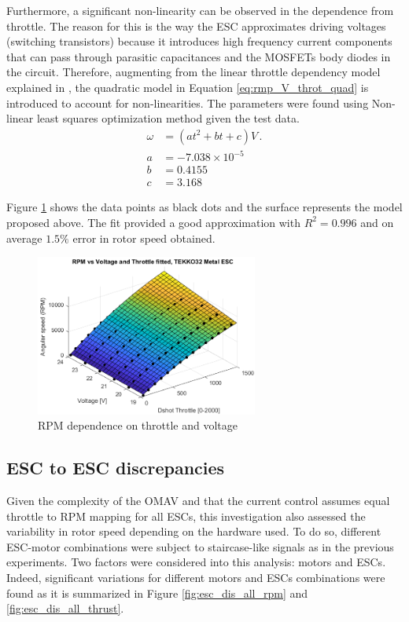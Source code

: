 Furthermore, a significant non-linearity can be observed in the dependence from throttle. The reason for this is the way the ESC approximates driving voltages (switching transistors) because it introduces high frequency current components that can pass through parasitic capacitances and the MOSFETs body diodes in the circuit. Therefore, augmenting from the linear throttle dependency model explained in \cite{Moutinho2015}, the quadratic model in Equation \ref{eq:rmp_V_throt_quad} is introduced to account for non-linearities. The parameters were found using Non-linear least squares optimization method given the test data.
\begin{equation}
\begin{split}
 \omega &= (at^2 +bt+c)V\, .\\
 a&=-7.038\times 10^{-5}\\
 b&=0.4155\\
 c&=3.168
\end{split} 
\label{eq:rmp_V_throt_quad}   
\end{equation}

Figure \ref{fig:rpm_fit} shows the data points as black dots and the surface represents the model proposed above. The fit provided a good approximation with $R^2=0.996$ and on average $1.5\%$ error in rotor speed obtained.

\begin{figure} 
    \centering
    \includegraphics[width=0.65\textwidth]{images/surf_rpm_model.png}
    \caption{RPM dependence on throttle and voltage}
    \label{fig:rpm_fit}
\end{figure}



\subsection{ESC to ESC discrepancies}
Given the complexity of the OMAV and that the current control assumes equal throttle to RPM mapping for all ESCs, this investigation also assessed the  variability in rotor speed depending on the hardware used. To do so, different ESC-motor combinations were subject to staircase-like signals as in the previous experiments. Two factors were considered into this analysis: motors and ESCs. Indeed, significant variations for different motors and ESCs combinations were found as it is summarized in Figure \ref{fig:esc_dis_all_rpm} and \ref{fig:esc_dis_all_thrust}.\\

